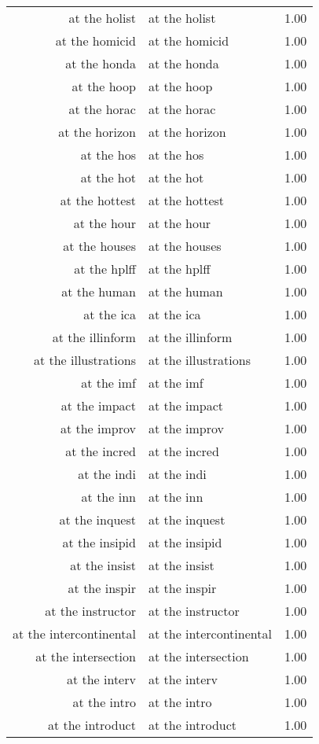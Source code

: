 \begin{table}[ht]
\begin{tabular}{rlr}
  at the holist & at the holist & 1.00 \\ 
  at the homicid & at the homicid & 1.00 \\ 
  at the honda & at the honda & 1.00 \\ 
  at the hoop & at the hoop & 1.00 \\ 
  at the horac & at the horac & 1.00 \\ 
  at the horizon & at the horizon & 1.00 \\ 
  at the hos & at the hos & 1.00 \\ 
  at the hot & at the hot & 1.00 \\ 
  at the hottest & at the hottest & 1.00 \\ 
  at the hour & at the hour & 1.00 \\ 
  at the houses & at the houses & 1.00 \\ 
  at the hplff & at the hplff & 1.00 \\ 
  at the human & at the human & 1.00 \\ 
  at the ica & at the ica & 1.00 \\ 
  at the illinform & at the illinform & 1.00 \\ 
  at the illustrations & at the illustrations & 1.00 \\ 
  at the imf & at the imf & 1.00 \\ 
  at the impact & at the impact & 1.00 \\ 
  at the improv & at the improv & 1.00 \\ 
  at the incred & at the incred & 1.00 \\ 
  at the indi & at the indi & 1.00 \\ 
  at the inn & at the inn & 1.00 \\ 
  at the inquest & at the inquest & 1.00 \\ 
  at the insipid & at the insipid & 1.00 \\ 
  at the insist & at the insist & 1.00 \\ 
  at the inspir & at the inspir & 1.00 \\ 
  at the instructor & at the instructor & 1.00 \\ 
  at the intercontinental & at the intercontinental & 1.00 \\ 
  at the intersection & at the intersection & 1.00 \\ 
  at the interv & at the interv & 1.00 \\ 
  at the intro & at the intro & 1.00 \\ 
  at the introduct & at the introduct & 1.00 \\ 

\end{tabular}
\end{table}
